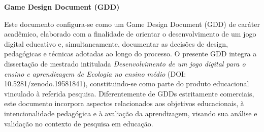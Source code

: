 \documentclass[
oneside,
12pt,                  %
a4paper,               %
brazil,                %
sumario=abnt-6027-2012 %
]{abntex2}
\newcommand{\tagbox}[2]{%
	\tikz[baseline=(n.base)]%
	\node[
	chamfered rectangle,
	draw=#2!60!black,
	fill=#2!20,
	text=#2!10!black,
	very thick,
	chamfered rectangle corners={north east,south east}, %
	inner xsep=3pt,
	inner ysep=-1pt,
	font=\tiny,
	line width=0.4pt
	] (n) {#1};%
}
\newcommand{\tagPensado}{\tagbox{Pensado}{yellow}\xspace}
\newcommand{\tagPossivel}{\tagbox{Possível}{blue}\xspace}
\newcommand{\tagImplementado}{\tagbox{Implementado}{green}\xspace}
\newcommand{\tagFalha}{\tagbox{Falha}{red}\xspace}
\newcommand{\tagDificuldade}{\tagbox{Dificuldade}{orange}\xspace}
\begin{document}
	
%	
%	
%	
%	
%	
%	
%	


	\begin{center}
		\textbf{\large Game Design Document (GDD)}
	\end{center}
	\setlength{\parskip}{1em}
	\setlength{\parindent}{1.25cm}
	
	Este documento configura-se como um Game Design Document (GDD) de caráter acadêmico, elaborado com a finalidade de orientar o desenvolvimento de um jogo digital educativo e, simultaneamente, documentar as decisões de design, pedagógicas e técnicas adotadas ao longo do processo. O presente GDD integra a dissertação de mestrado intitulada \textit{Desenvolvimento de um jogo digital para o ensino e aprendizagem de Ecologia no ensino médio} (DOI: 10.5281/zenodo.19581841), constituindo-se como parte do produto educacional vinculado à referida pesquisa. Diferentemente de GDDs estritamente comerciais, este documento incorpora aspectos relacionados aos objetivos educacionais, à intencionalidade pedagógica e à avaliação da aprendizagem, visando sua análise e validação no contexto de pesquisa em educação.
	
\end{document}
